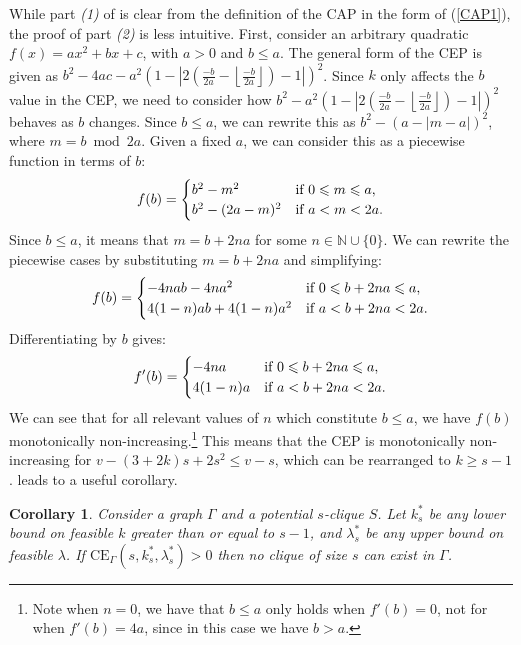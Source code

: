 \documentclass[11pt, baustms]{amsproc}
\theoremstyle{scplain}
\newtheorem{corollary}[theorem]{Corollary}
\newcommand\CE{\mathrm{CE}}
\renewcommand\le{\leqslant}
\renewcommand\ge{\geqslant}
\begin{document}
While part \textit{(1)} of  is clear from the definition of the CAP in the form of (\ref{CAP1}), the proof of part \textit{(2)} is less intuitive. First, consider an arbitrary quadratic $f(x) = ax^2 + bx + c$, with $a > 0$ and $b \le a$. The general form of the CEP is given as $b^2-4ac-a^2\left(1-\left|2\left(\frac{-b}{2a}- \left\lfloor \frac{-b}{2a} \right\rfloor\right)-1\right|\right)^2$. Since $k$ only affects the $b$ value in the CEP, we need to consider how $b^2-a^2\left(1-\left|2\left(\frac{-b}{2a}- \left\lfloor \frac{-b}{2a} \right\rfloor\right)-1\right|\right)^2$ behaves as $b$ changes. Since $b \le a$, we can rewrite this as $b^2 - (a - |m  - a|)^2$, where $m = b \bmod 2a$. Given a fixed $a$, we can consider this as a piecewise function in terms of $b$:
		\[f(b)=
		\begin{cases}
			b^2 - m^2 & \textnormal{if } 0 \le m \le a, \\
			b^2 - (2a - m)^2 & \textnormal{if } a < m < 2a.
		\end{cases}
		\]
		\vspace{-0.1cm}
		Since $b \le a$, it means that $m = b + 2na$ for some $n \in \mathbb{N} \cup \{0\}$. We can rewrite the piecewise cases by substituting $m = b + 2na$ and simplifying:
		\[f(b)=
		\begin{cases}
			-4nab-4na^2 & \textnormal{if } 0 \le b + 2na \le a, \\
			 4(1-n)ab +4(1-n)a^2 & \textnormal{if } a < b + 2na < 2a.
		\end{cases}
		\] 
		\vspace{-0.1cm}
		\leavevmode
		Differentiating by $b$ gives: 	
		\[f'(b)=
		\begin{cases}
			-4na & \textnormal{if } 0 \le b + 2na \le a, \\
			 4(1-n)a & \textnormal{if } a < b + 2na < 2a.
		\end{cases}
		\]  
		We can see that for all relevant values of $n$ which constitute $b \le a$, we have $f(b)$ monotonically non-increasing.\footnote{Note when $n=0$, we have that $b \le a$ only holds when $f'(b) = 0$, not for when $f'(b) = 4a$, since in this case we have $b>a$.} This means that the CEP is monotonically non-increasing for $v - (3 + 2 k) s + 2 s^2 \le v-s$, which can be rearranged to $k \ge s-1$. 
         leads to a useful corollary.
        
   	\begin{corollary} 
    \label{visual}
		Consider a graph $\Gamma$ and a potential $s$-clique $S$. Let $k^*_s$ be any lower bound on feasible $k$ greater than or equal to $s-1$, and $\lambda^*_s$ be any upper bound on feasible $\lambda$. If $\CE_\Gamma(s, k^*_s, \lambda^*_s) > 0$ then no clique of size $s$ can exist in $\Gamma$.
	\end{corollary} 
\end{document}
